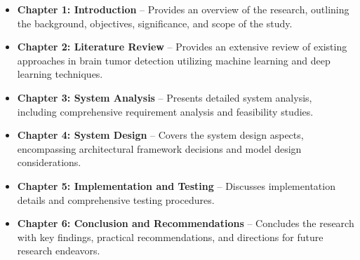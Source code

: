 \begin{itemize}

    \item \textbf{Chapter 1: Introduction} – Provides an overview of the research, outlining the background, objectives, significance, and scope of the study.

    \item \textbf{Chapter 2: Literature Review} – Provides an extensive review of existing approaches in brain tumor detection utilizing machine learning and deep learning techniques.

    \item \textbf{Chapter 3: System Analysis} – Presents detailed system analysis, including comprehensive requirement analysis and feasibility studies.

    \item \textbf{Chapter 4: System Design} – Covers the system design aspects, encompassing architectural framework decisions and model design considerations.

    \item \textbf{Chapter 5: Implementation and Testing} – Discusses implementation details and comprehensive testing procedures.

    \item \textbf{Chapter 6: Conclusion and Recommendations} – Concludes the research with key findings, practical recommendations, and directions for future research endeavors.

\end{itemize}